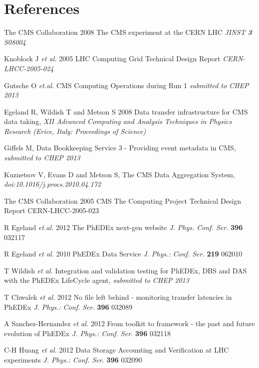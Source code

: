 \section*{References}

\begin{thebibliography}{1}
The CMS Collaboration 2008 The CMS experiment at the CERN LHC {\it JINST {\bf 3} S08004}

Knoblock J {\it et al.} 2005 LHC Computing Grid Technical Design Report {\it CERN-LHCC-2005-024}

 Gutsche O {\it et.al.} CMS Computing Operations during Run 1 {\it submitted to CHEP 2013}

  Egeland R, Wildish T and Metson S 2008 Data transfer infrastructure for CMS data taking,  {\it XII Advanced Computing and Analysis Techniques in Physics Research (Erice, Italy: Proceedings of Science)}

Giffels M, Data Bookkeeping Service 3 - Providing event metadata in CMS, {\it submitted to CHEP 2013}

Kuznetsov V, Evans D and Metson S, The CMS Data Aggregation System,
{\it doi:10.1016/j.procs.2010.04.172}

The CMS Collaboration 2005 CMS The Computing Project Technical Design Report CERN-LHCC-2005-023

R Egeland {\it et.al.} 2012  The PhEDEx next-gen website {\it J. Phys. Conf. Ser.} {\bf 396} 032117

R Egeland {\it et al.} 2010  PhEDEx Data Service {\it J. Phys.: Conf. Ser.} {\bf 219} 062010

T Wildish {\it et al.} Integration and validation testing for PhEDEx, DBS and DAS with the PhEDEx LifeCycle agent,
{\it submitted to CHEP 2013}

T Chwalek {\it et al.} 2012  No file left behind - monitoring transfer latencies in PhEDEx {\it J. Phys.: Conf. Ser.} {\bf 396} 032089

A Sanchez-Hernandez {\it et al.} 2012 From toolkit to framework - the past and future evolution of PhEDEx {\it J. Phys.: Conf. Ser.} {\bf 396} 032118

C-H Huang {\it et al.}  2012 Data Storage Accounting and Verification at LHC experiments  {\it J. Phys.: Conf. Ser.} {\bf 396} 032090 


\end{thebibliography}
